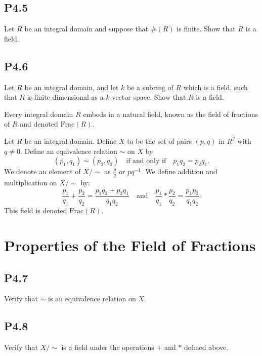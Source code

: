 \documentclass[lang=cn,11pt]{template}
\begin{document}
\subsection*{P4.5} Let \( R \) be an integral domain and suppose that \( \#(R) \) is finite. Show that \( R \) is a field.

\subsection*{P4.6} Let \( R \) be an integral domain, and let \( k \) be a subring of \( R \) which is a field, such that \( R \) is finite-dimensional as a \( k \)-vector space. Show that \( R \) is a field.

\begin{remark}
Every integral domain \( R \) embeds in a natural field, known as the field of fractions of \( R \) and denoted \( \text{Frac}(R) \).
\end{remark}

\begin{definition}
Let \( R \) be an integral domain. Define \( X \) to be the set of pairs \( (p, q) \) in \( R^2 \) with \( q \neq 0 \). Define an equivalence relation \( \sim \) on \( X \) by
\[
(p_1, q_1) \sim (p_2, q_2) \quad \text{if and only if} \quad p_1 q_2 = p_2 q_1.
\]
We denote an element of \( X / \sim \) as \( \frac{p}{q} \) or \( pq^{-1} \). We define addition and multiplication on \( X / \sim \) by:
\[
\frac{p_1}{q_1} + \frac{p_2}{q_2} = \frac{p_1 q_2 + p_2 q_1}{q_1 q_2} \quad \text{and} \quad \frac{p_1}{q_1} * \frac{p_2}{q_2} = \frac{p_1 p_2}{q_1 q_2}.
\]
This field is denoted \( \text{Frac}(R) \).
\end{definition}

\section{Properties of the Field of Fractions}

\subsection*{P4.7} Verify that \( \sim \) is an equivalence relation on \( X \).

\subsection*{P4.8} Verify that \( X / \sim \) is a field under the operations \( + \) and \( * \) defined above.
\end{document}
